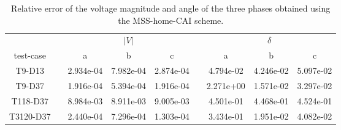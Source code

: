 \begin{table}
\renewcommand{\arraystretch}{1.3}
\centering
\label{}\hspace{2cm}\caption{Relative error of the voltage magnitude and angle of the three phases obtained using the MSS-home-CAI scheme. }
\begin{adjustbox}{width=1\textwidth} %
\small
\begin{tabular}{ccccccccc}
\toprule
{} && \multicolumn{3}{c}{$|V|$} && \multicolumn{3}{c}{$\delta$}  \\
\cmidrule{3-5}\cmidrule{7-9}
 test-case &&        a &        b &       c &&        a &       b &        c \\
\midrule
T9-D13       &&  2.934e-04 &  7.982e-04 &  2.874e-04 &&  4.794e-02 &  4.246e-02 &  5.097e-02 \\
T9-D37       &&  1.916e-04 &  5.394e-04 &  1.916e-04 &&  2.271e+00 &  1.571e-02 &  3.297e-02 \\
T118-D37     &&  8.984e-03 &  8.911e-03 &  9.005e-03 &&  4.501e-01 &  4.468e-01 &  4.524e-01 \\
T3120-D37    &&  2.440e-04 &  7.296e-04 &  1.303e-04 &&  3.434e-01 &  1.951e-02 &  4.082e-02 \\
\bottomrule
\end{tabular}
\end{adjustbox}
\end{table}

